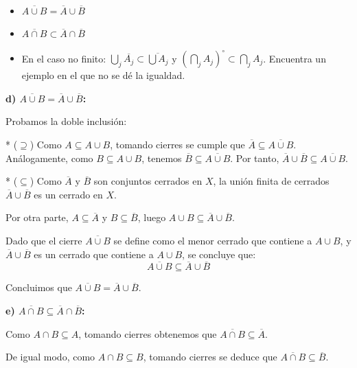 \begin{ejer}
    [38 d) e) f)] \,
    \begin{itemize}
        \item[d)] $\overline{A \cup B} = \overline{A} \cup \overline{B}$
        \item[e)] $\overline{A\cap B} \subset \overline{A} \cap \overline{B}$
        \item[f)] En el caso no finito: $\bigcup_j \overline{A_j} \subset \overline{\bigcup A_j}$ y $(\bigcap_j A_j)^{\circ} \subset \bigcap_j A_j$. Encuentra un ejemplo en el que no se dé la igualdad.
    \end{itemize}
\end{ejer}
\begin{sol}
    \textbf{d) $\overline{A \cup B} = \overline{A} \cup \overline{B}$:}

    Probamos la doble inclusión:

    * ($\supseteq$) Como $A \subseteq A \cup B$, tomando cierres se cumple que $\overline{A} \subseteq \overline{A \cup B}$. Análogamente, como $B \subseteq A \cup B$, tenemos $\overline{B} \subseteq \overline{A \cup B}$. Por tanto, $\overline{A} \cup \overline{B} \subseteq \overline{A \cup B}$.

    * ($\subseteq$) Como $\overline{A}$ y $\overline{B}$ son conjuntos cerrados en $X$, la unión finita de cerrados $\overline{A} \cup \overline{B}$ es un cerrado en $X$.
    
      Por otra parte, $A \subseteq \overline{A}$ y $B \subseteq \overline{B}$, luego $A \cup B \subseteq \overline{A} \cup \overline{B}$.
    
      Dado que el cierre $\overline{A \cup B}$ se define como el menor cerrado que contiene a $A \cup B$, y $\overline{A} \cup \overline{B}$ es un cerrado que contiene a $A \cup B$, se concluye que:
      \[
          \overline{A \cup B} \subseteq \overline{A} \cup \overline{B}
      \]

    Concluimos que $\overline{A \cup B} = \overline{A} \cup \overline{B}$.

    \medskip

    \textbf{e) $\overline{A \cap B} \subseteq \overline{A} \cap \overline{B}$:}

    Como $A \cap B \subseteq A$, tomando cierres obtenemos que $\overline{A \cap B} \subseteq \overline{A}$.
    
    De igual modo, como $A \cap B \subseteq B$, tomando cierres se deduce que $\overline{A \cap B} \subseteq \overline{B}$.
    

\end{sol}
